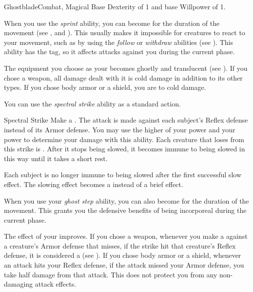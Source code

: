     \begin{feat}{Ghostblade}{Combat, Magical}
        \featpre Base Dexterity of 1 and base Willpower of 1.

         When you use the \textit{sprint} ability, you can become  for the duration of the movement (see , and ).
        This usually makes it impossible for creatures to react to your movement, such as by using the \textit{follow} or \textit{withdraw} abilities (see ).
        This ability has the  tag, so it affects attacks against you during the current phase.

         The equipment you choose as your  becomes ghostly and translucent (see ).
        If you chose a weapon, all damage dealt with it is cold damage in addition to its other types.
        If you chose body armor or a shield, you are  to cold damage.

         You can use the \textit{spectral strike} ability as a standard action.
        \begin{durationability}{Spectral Strike}
            \rankline
            Make a .
            The attack is made against each subject's Reflex defense instead of its Armor defense.
            You may use the higher of your  power and your  power to determine your damage with this ability.
            Each creature that loses  from this strike is  \slowed.
            After it stops being slowed, it becomes immune to being slowed in this way until it takes a short rest.

            \rankline
             Each subject is no longer immune to being slowed after the first successful slow effect.
             The slowing effect becomes a  instead of a brief effect.
        \end{durationability}

         When you use your \textit{ghost step} ability, you can also become  for the duration of the movement.
        This grants you the defensive benefits of being incorporeal during the current phase.

         The effect of your  improves.
        If you chose a weapon, whenever you make a  against a creature's Armor defense that misses, if the strike hit that creature's Reflex defense, it is considered a  (see ).
        If you chose body armor or a shield, whenever an attack hits your Reflex defense, if the attack missed your Armor defense, you take half damage from that attack.
        This does not protect you from any non-damaging attack effects.


\end{feat}
